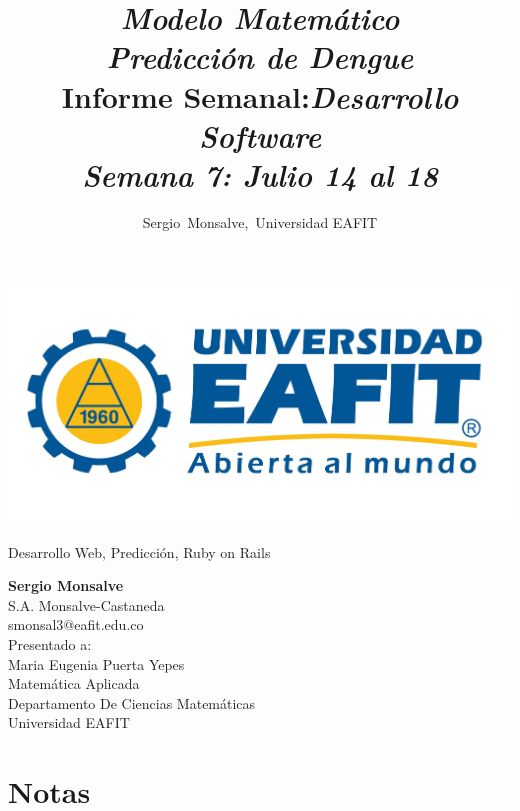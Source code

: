 \documentclass[12pt,journal,compsoc, onecolumn]{aux/IEEEtran}
\author{Sergio~Monsalve,~Universidad EAFIT}
\title{ \textbf{\textit{Modelo Matemático\\ Predicción de Dengue}}\\
Informe Semanal:\em{Desarrollo Software}\\
Semana 7: Julio 14 al 18 \\
}
\begin{document}
\pagestyle{fancyplain}
\fancyhf{}
\headheight=30pt %
\renewcommand{\headrulewidth}{0pt} %

\lhead %
{
\begin{minipage}{2cm}
\includegraphics[width=1.5 in]{aux/Logo_EAFIT.jpg}
\end{minipage}
}

\fancyfoot[c]{\thepage}

\maketitle

\begin{IEEEkeywords}
Desarrollo Web, Predicción, Ruby on Rails
\end{IEEEkeywords}

 
 \newpage
 \newpage
 \newpage

\begin{center}
\begin{IEEEbiographynophoto}{}
\textbf{Sergio Monsalve}\\
S.A. Monsalve-Castaneda \\
smonsal3@eafit.edu.co\\

Presentado a:\\
Maria Eugenia Puerta Yepes\\[0.2cm]
Matemática Aplicada\\
Departamento De Ciencias Matemáticas\\
Universidad EAFIT
\end{IEEEbiographynophoto}
\end{center}





\appendix
\chapter{Notas}

\end{document}
